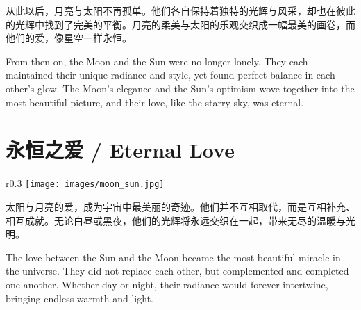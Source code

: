 从此以后，月亮与太阳不再孤单。他们各自保持着独特的光辉与风采，却也在彼此的光辉中找到了完美的平衡。月亮的柔美与太阳的乐观交织成一幅最美的画卷，而他们的爱，像星空一样永恒。

\begin{flushright}
From then on, the Moon and the Sun were no longer lonely. They each maintained their unique radiance and style, yet found perfect balance in each other’s glow. The Moon’s elegance and the Sun’s optimism wove together into the most beautiful picture, and their love, like the starry sky, was eternal.
\end{flushright}

\section*{永恒之爱 / Eternal Love}

\begin{wrapfigure}{r}{0.3\textwidth}  %
    \texttt{[image: images/moon\_sun.jpg]} %
\end{wrapfigure}

太阳与月亮的爱，成为宇宙中最美丽的奇迹。他们并不互相取代，而是互相补充、相互成就。无论白昼或黑夜，他们的光辉将永远交织在一起，带来无尽的温暖与光明。

\begin{flushright}
The love between the Sun and the Moon became the most beautiful miracle in the universe. They did not replace each other, but complemented and completed one another. Whether day or night, their radiance would forever intertwine, bringing endless warmth and light.
\end{flushright}
